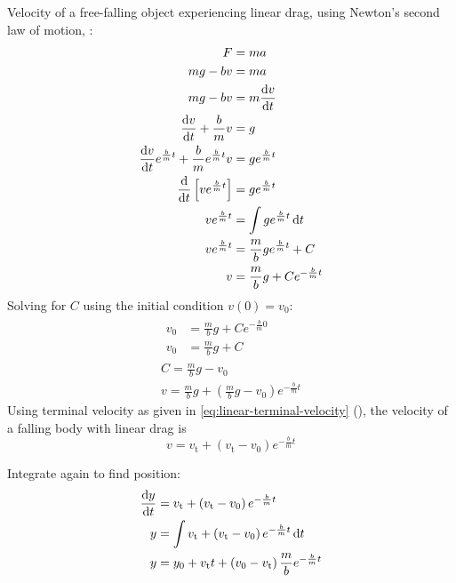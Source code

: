 \documentclass[a4paper, titlepage]{book}
\begin{document}
Velocity of a free-falling object experiencing linear drag,
using Newton's second law of motion, :
\begin{equation}
    \begin{aligned}
        F &= ma \\
        mg - bv &= ma \\
        mg - bv &= m \odv{v}{t} \\
        \odv{v}{t} + \frac{b}{m} v &= g \\
        \odv{v}{t} e^{\frac{b}{m} t} + \frac{b}{m} e^{\frac{b}{m} t} v &= g e^{\frac{b}{m} t} \\
        \odv{}{t} \left[ v e^{\frac{b}{m} t} \right] &= g e^{\frac{b}{m} t} \\
        v e^{\frac{b}{m} t} &= \int g e^{\frac{b}{m} t} \odif{t} \\
        v e^{\frac{b}{m} t} &= \frac{m}{b} g e^{\frac{b}{m}t} + C \\
        v &= \frac{m}{b} g + C e^{-\frac{b}{m} t} \\
    \end{aligned}
\end{equation}
Solving for \(C\) using the initial condition \(v(0) = v_0\):
\begin{equation}
    \begin{gathered}
        \begin{aligned}
            v_0 &= \frac{m}{b} g + C e^{-\frac{b}{m} 0} \\
            v_0 &= \frac{m}{b} g + C
        \end{aligned} \\
        C = \frac{m}{b} g - v_0 \\
        v = \frac{m}{b} g + \left( \frac{m}{b} g - v_0 \right) e^{-\frac{b}{m} t}
    \end{gathered}
\end{equation}
Using terminal velocity as given in \cref{eq:linear-terminal-velocity}
(),
the velocity of a falling body with linear drag is
\begin{equation}
    v = v_\mathrm{t} + \left( v_\mathrm{t} - v_0 \right) e^{-\frac{b}{m} t}
\end{equation}

Integrate again to find position:
\begin{equation}
    \begin{aligned}
        \odv{y}{t} &= v_\mathrm{t} + \left( v_\mathrm{t} - v_0 \right) e^{-\frac{b}{m} t} \\
        y &= \int v_\mathrm{t} + \left( v_\mathrm{t} - v_0 \right) e^{-\frac{b}{m} t} \odif{t} \\
        y &= y_0
             + v_\mathrm{t} t
             + \left( v_0 - v_\mathrm{t} \right)
               \frac{m}{b}
               e^{-\frac{b}{m} t}
    \end{aligned}
\end{equation}
\end{document}
